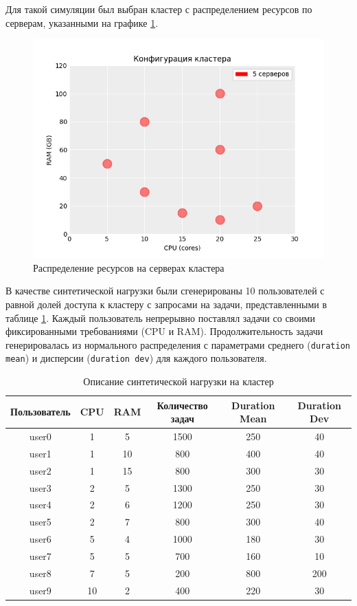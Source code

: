 Для такой симуляции был выбран кластер с распределением ресурсов по серверам, указанными на графике \ref{fig:cluster-resources-distribution}.

\begin{figure}[h!]
    \centering 
    \includegraphics[width=0.7\linewidth]{images/hosts_distribution}
    \caption{Распределение ресурсов на серверах кластера}
    \label{fig:cluster-resources-distribution}
\end{figure}

В качестве синтетической нагрузки были сгенерированы 10 пользователей с равной долей доступа к кластеру с запросами на задачи, представленными в таблице \ref{tab:tasks_load_description}. Каждый пользователь непрерывно поставлял задачи со своими фиксированными требованиями (CPU и RAM). Продолжительность задачи генерировалась из нормального распределения с параметрами среднего (\texttt{duration mean}) и дисперсии (\texttt{duration dev}) для каждого пользователя. 

\begin{table}[h!]
    \centering
    \begin{tabular}{|c|c|c|c|c|c|}
        \hline
        \textbf{Пользователь} & \textbf{CPU} & \textbf{RAM} & \textbf{Количество задач} & \textbf{Duration Mean} & \textbf{Duration Dev} \\
        \hline
        user0 & 1 & 5 & 1500 & 250 & 40 \\
        \hline
        user1 & 1 & 10 & 800 & 400 & 40 \\
        \hline
        user2 & 1 & 15 & 800 & 300 & 30 \\
        \hline
        user3 & 2 & 5 & 1300 & 250 & 30 \\
        \hline
        user4 & 2 & 6 & 1200 & 250 & 30 \\
        \hline
        user5 & 2 & 7 & 800 & 300 & 40 \\
        \hline
        user6 & 5 & 4 & 1000 & 180 & 30 \\
        \hline
        user7 & 5 & 5 & 700 & 160 & 10 \\
        \hline
        user8 & 7 & 5 & 200 & 800 & 200 \\
        \hline
        user9 & 10 & 2 & 400 & 220 & 30 \\
        \hline
    \end{tabular}
    \caption{Описание синтетической нагрузки на кластер}
    \label{tab:tasks_load_description}
\end{table}



